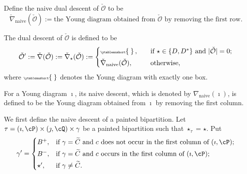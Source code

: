 \documentclass[11pt,a4paper]{amsart}
\newcommand{\CO}{{\mathcal {O}}}
\def\eDD{\overline{\nabla}}
\newcommand{\be}{\begin {equation}}
\newcommand{\ee}{\end {equation}}
\numberwithin{equation}{section}
\theoremstyle{remark}
\let\ytb=\ytableaushort
\newcommand{\tytb}[1]{{\tiny\ytb{#1}}}
\begin{document}
 Define the naive dual descent of $\check \CO$ to be
 \[
  \check \nabla_{\mathrm{naive}}(\check \CO):= \textrm{the Young diagram obtained from $\check \CO$ by removing the first row}.
  \]


   The dual descent of $\check \CO$ is defined to be
  \be\label{duald}
   \check \CO':=\check \nabla(\check \CO):=\check \nabla_\star( \check \CO):=\begin{cases}
   \tytb{\   }\, , \quad& \textrm{if $\star\in \{D, D^*\}$ and $|\check \CO|=0$};\smallskip\\
   \check \nabla_{\mathrm{naive}}(\check \CO), \quad & \textrm{otherwise},
    \end{cases}
  \ee
  where $\tytb{\   }$ denotes the Young diagram with exactly one box. 
  

For a Young diagram $\imath$, its naive descent, which is denoted by $\nabla_\mathrm{naive}(\imath)$, is defined to be the Young diagram obtained from $\imath$ by removing the first column. 

\def\bipartl{\mathrm{bi\cP_L}}
\def\bipartr{\mathrm{bi\cP_R}}
\def\dsdiagl{\mathrm{DS_L}}
\def\dsdiagr{\mathrm{DS_R}}
\def\DDl{\eDD_\mathrm{L}}
\def\DDr{\eDD_\mathrm{R}}

We first define the naive descent of a painted bipartition. Let $\tau=(\imath,\cP)\times (\jmath,\cQ)\times \gamma $ be a  painted bipartition such that $\star_\tau=\star$. Put
  \begin{equation} \label{eq:def.alphap}
    \gamma '=\begin{cases} B^+,
  & \textrm{if $\gamma =\widetilde{C}$ and $c$ does not occur in the first column of $(\imath,\cP)$}; \smallskip \\
  B^-,
  & \textrm{if $\gamma =\widetilde{C}$ and  $c$ occurs in the first column of $(\imath,\cP)$}; \smallskip \\
  \star', & \textrm{if $\gamma \neq \widetilde C$}.
  \end{cases}
  \end{equation}
\end{document}
